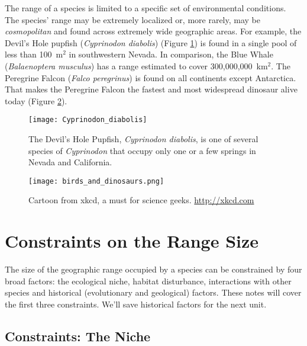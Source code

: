 \documentclass[11pt, hidelinks]{article}
\begin{document}
The range of a species is limited to a specific set of environmental conditions. The species' range may be  extremely localized or, more rarely, may be \emph{cosmopolitan} and found across extremely wide geographic areas. For example, the Devil's Hole pupfish (\emph {Cyprinodon diabolis}) (Figure \ref{cdiabolis}) is found in a single pool of less than 100~m$^2$ in southwestern Nevada. In comparison, the Blue Whale (\emph{Balaenoptera musculus}) has a range estimated to cover 300,000,000~km$^2$.  The Peregrine Falcon (\emph{Falco peregrinus}) is found on all continents except Antarctica. That makes the Peregrine Falcon  the fastest and most widespread dinosaur alive today (Figure \ref{xkcd}).


\begin{figure}[htb]
	\centering
		\texttt{[image: Cyprinodon\_diabolis]}  
		\caption{The Devil's Hole Pupfish, \emph{Cyprinodon diabolis}, is one of several species of \emph{Cyprinodon} that occupy only one or a few springs in Nevada and California.\label{cdiabolis}}
		
\end{figure}


\begin{figure}
	\centering
	\texttt{[image: birds\_and\_dinosaurs.png]}
	\caption{Cartoon from xkcd, a must for science geeks.\label{xkcd} \url{http://xkcd.com}}
\end{figure}

\section{Constraints on the Range Size}

The size of the geographic range occupied by a species can be constrained by four broad factors: the ecological niche, habitat disturbance, interactions with other species and historical (evolutionary and geological) factors.  These notes will cover the first three constraints. We'll save historical factors for the next unit.


\subsection{Constraints: The Niche}
\end{document}
